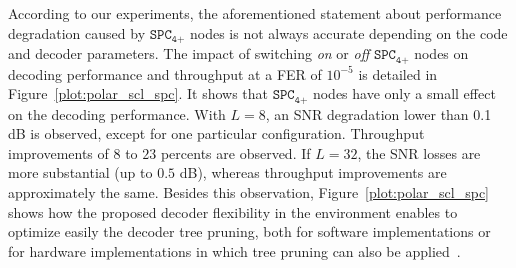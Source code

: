 According to our experiments, the aforementioned statement about performance
degradation caused by $\texttt{SPC}_\texttt{4+}$ nodes is not always accurate
depending on the code and decoder parameters. The impact of switching
\textit{on} or \textit{off} $\texttt{SPC}_\texttt{4+}$ nodes on decoding
performance and throughput at a FER of $10^{-5}$ is detailed in
Figure~\ref{plot:polar_scl_spc}. It shows that $\texttt{SPC}_\texttt{4+}$ nodes
have only a small effect on the decoding performance. With $L=8$, an SNR
degradation lower than 0.1 dB is observed, except for one particular
configuration. Throughput improvements of $8$ to $23$ percents are observed. If
$L=32$, the SNR losses are more substantial (up to $0.5$ dB), whereas throughput
improvements are approximately the same. Besides this observation,
Figure~\ref{plot:polar_scl_spc} shows how the proposed decoder flexibility in
the \AFFECT environment enables to optimize easily the decoder tree pruning,
both for software implementations or for hardware implementations in which tree
pruning can also be applied~\cite{Lin2014}.




